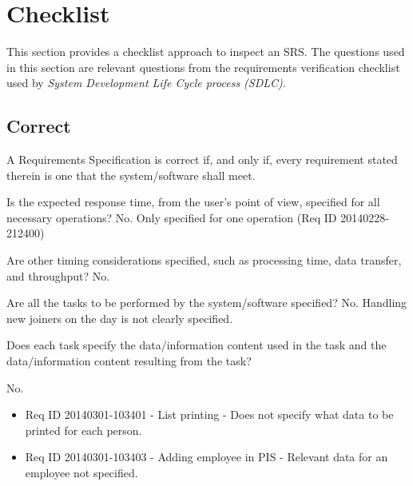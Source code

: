 \documentclass[Main]{subfiles}
\begin{document}
\section{Checklist}

This section provides a checklist approach to inspect an SRS. The questions used in this section are relevant questions from the requirements verification checklist used by \textit{System Development Life Cycle process (SDLC)}.

\subsection{Correct}
A Requirements Specification is correct if, and only if, every requirement stated therein is one that the system/software shall meet.

\begin{CheckTable}
\Check
{Is the expected response time, from the user’s point of view, specified for all necessary operations?}
{No. Only specified for one operation (Req ID 20140228-212400)}

\Check
{Are other timing considerations specified, such as processing time, data transfer, and throughput?}
{No.}

\Check
{Are all the tasks to be performed by the system/software specified?}
{No. Handling new joiners on the day is not clearly specified.}

\Check
{Does each task specify the data/information content used in the task and the data/information content resulting from the task?}
{No. 
\begin{itemize}
\item Req ID 20140301-103401 - List printing - Does not specify what data to be printed for each person.
\item Req ID 20140301-103403 - Adding employee in PIS - Relevant data for an employee not specified.
\end{itemize}}






\end{CheckTable}
\end{document}
